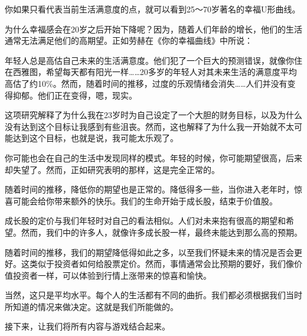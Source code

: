 你如果只看代表当前生活满意度的点，就可以看到25～70岁著名的幸福U形曲线。

为什么幸福感会在20岁之后开始下降呢？因为，随着人们年龄的增长，他们的生活通常无法满足他们的高期望。正如劳赫在《你的幸福曲线》中所说：

年轻人总是高估自己未来的生活满意度。他们犯了一个巨大的预测错误，就像你住在西雅图，希望每天都有阳光一样……20多岁的年轻人对其未来生活的满意度平均高估了约10\%。然而，随着时间的推移，过度的乐观情绪会消失……人们并没有变得抑郁。他们正在变得，嗯，现实。

这项研究解释了为什么我在23岁时为自己设定了一个大胆的财务目标，以及为什么没有达到这个目标让我感到有些沮丧。然而，这也解释了为什么我一开始就不太可能达到这个目标，也就是说，我可能太乐观了。

你可能也会在自己的生活中发现同样的模式。年轻的时候，你可能期望很高，后来却失望了。然而，正如研究表明的那样，这是完全正常的。

随着时间的推移，降低你的期望也是正常的。降低得多一些，当你进入老年时，惊喜可能会给你带来额外的快乐。我们的生命开始于成长股，结束于价值股。

成长股的定价与我们年轻时对自己的看法相似。人们对未来抱有很高的期望和希望。然而，我们中的许多人，就像许多成长股一样，最终未能达到那么高的预期。

随着时间的推移，我们的期望降低得如此之多，以至我们怀疑未来的情况是否会更好。这类似于投资者如何给股票定价。然而，事情通常会比预期的要好，我们像价值投资者一样，可以体验到行情上涨带来的惊喜和愉快。

当然，这只是平均水平。每个人的生活都有不同的曲折。我们都必须根据我们当时所知道的情况来做决定。这就是我们所能做的。

接下来，让我们将所有内容与游戏结合起来。

